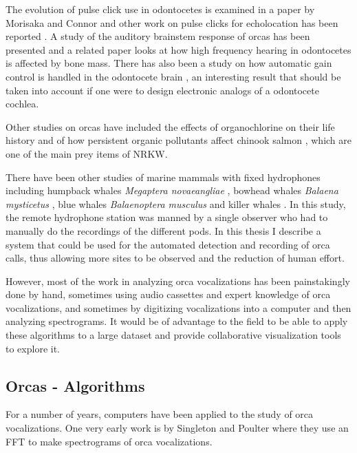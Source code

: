 The evolution of pulse click use in odontocetes is examined in a paper
by Morisaka and Connor \cite{morisaka07predation} and other work on
pulse clicks for echolocation has been reported
\cite{simon07echolocation}.  A study of the auditory brainstem
response of orcas has been presented \cite{szymanski1999brainstem} and
a related paper \cite{hemil2001mass} looks at how high frequency
hearing in odontocetes is affected by bone mass.  There has also been
a study on how automatic gain control is handled in the odontocete
brain \cite{supin2008forward}, an interesting result that should be
taken into account if one were to design electronic analogs
\cite{lyon1982cochlea} of a odontocete cochlea.

Other studies on orcas have included the effects of organochlorine on
their life history \cite{ylitalo2001organochlorine} and of how
persistent organic pollutants affect chinook salmon
\cite{cullon2009pollutants}, which are one of the main prey items of
NRKW.

There have been other studies of marine mammals with fixed hydrophones
including humpback whales \textit{Megaptera novaeangliae}
\cite{norris1999humpback}, bowhead whales \textit{Balaena mysticetus}
\cite{cummings1985pam}, blue whales \textit{Balaenoptera musculus}
\cite{stafford1998longrange} and killer whales
\cite{morton2002displacement}.  In this study, the remote hydrophone
station was manned by a single observer who had to manually do the
recordings of the different pods.  In this thesis I describe a system
that could be used for the automated detection and recording of orca
calls, thus allowing more sites to be observed and the reduction of
human effort.

However, most of the work in analyzing orca vocalizations has been
painstakingly done by hand, sometimes using audio cassettes and expert
knowledge of orca vocalizations, and sometimes by digitizing
vocalizations into a computer and then analyzing spectrograms.  It
would be of advantage to the field to be able to apply these
algorithms to a large dataset and provide collaborative visualization
tools to explore it.

\subsection{Orcas - Algorithms}
\label{sec:relatedWork:orcasAlgorithms}

For a number of years, computers have been applied to the study of
orca vocalizations.  One very early work is by Singleton and Poulter
\cite{singleton1967spectral} where they use an FFT to make
spectrograms of orca vocalizations.


